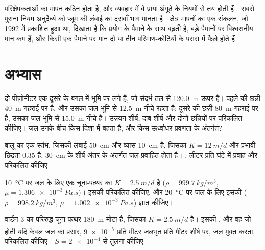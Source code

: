 परिक्षेपकताओं का मापन कठिन होता है, और व्यवहार में वे प्रायः
अंगूठे के नियमों से तय होती हैं। सबसे पुराना नियम अनुदैर्ध्य  को
प्लूम की लंबाई का दसवाँ भाग मानता है। क्षेत्र मापनों का एक संकलन, जो
1992 में प्रकाशित हुआ था, दिखाता है कि  प्रयोग के पैमाने के साथ बढ़ती है,
बड़े पैमानों पर विश्वसनीय मान कम हैं, और किसी एक पैमाने पर
मान दो या तीन परिमाण-कोटियों के परास में फैले होते हैं।

\section{अभ्यास}

\begin{exercise}[$\star$]\label{exo:b3:hydrogeology:1}
दो पीज़ोमीटर एक-दूसरे के बगल में भूमि पर लगे हैं, जो
संदर्भ-तल से \qty{120.0}{m} ऊपर हैं। पहले की छन्नी \qty{40}{m} गहराई पर है, और उसका जल
भूमि से \qty{12.5}{m} नीचे रहता है; दूसरे की छन्नी \qty{80}{m}
गहराई पर है, उसका जल भूमि से \qty{15.0}{m} नीचे है। उन्नयन
शीर्ष, दाब शीर्ष और  दोनों छन्नियों पर परिकलित कीजिए। जल उनके बीच किस
दिशा में बहता है, और किस ऊर्ध्वाधर प्रवणता के अंतर्गत?
\end{exercise}

\begin{exercise}[$\star$]\label{exo:b3:hydrogeology:2}
बालू का एक स्तंभ, जिसकी लंबाई \qty{50}{cm} और व्यास \qty{10}{cm} है, जिसका $K =
\qty{12}{m/d}$ और प्रभावी छिद्रता 0.35 है, \qty{30}{cm} के शीर्ष अंतर के अंतर्गत
जल प्रवाहित होता है। , लीटर प्रति
घंटे में प्रवाह और  परिकलित कीजिए।
\end{exercise}

\begin{exercise}[$\star$]\label{exo:b3:hydrogeology:3}
\qty{10}{\celsius} पर जल के लिए एक चूना-पत्थर का $K = \qty{2.5}{m/d}$ है
($\rho = \qty{999.7}{kg/m^3}$, $\mu = \qty{1.306e-3}{Pa.s}$)। इसकी 
परिकलित कीजिए, और \qty{20}{\celsius} पर जल के लिए इसकी 
($\rho = \qty{998.2}{kg/m^3}$, $\mu =
\qty{1.002e-3}{Pa.s}$) ज्ञात कीजिए।
\end{exercise}

\begin{exercise}[$\star$]\label{exo:b3:hydrogeology:4}
वार्डन-3 का परिरुद्ध चूना-पत्थर \qty{180}{m} मोटा है, जिसका $K =
\qty{2.5}{m/d}$ है। इसकी , और वह  जो
होती यदि केवल जल का प्रसार, \num{9e-7} प्रति मीटर जलभृत प्रति मीटर शीर्ष पर,
जल मुक्त करता, परिकलित कीजिए। $S = \num{2e-4}$ से तुलना कीजिए।
\end{exercise}

